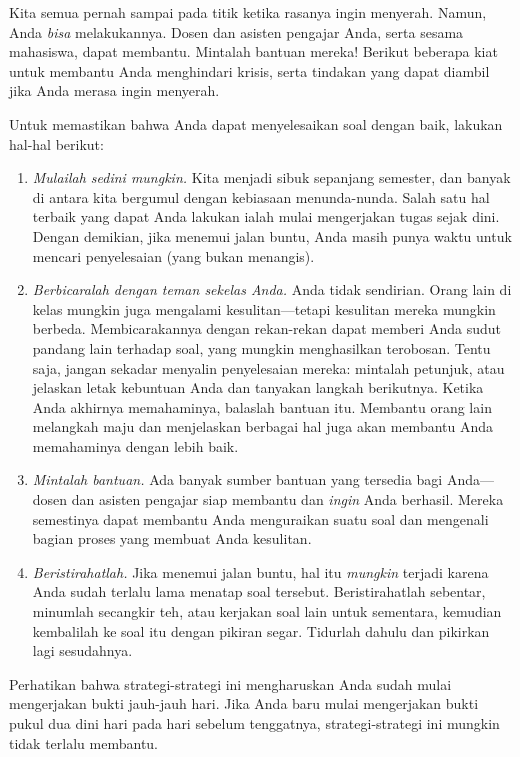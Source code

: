 \documentclass[../../../include/open-logic-section]{subfiles}
\begin{document}


Kita semua pernah sampai pada titik ketika rasanya ingin menyerah. Namun,
Anda \emph{bisa} melakukannya. Dosen dan asisten pengajar Anda, serta
sesama mahasiswa, dapat membantu. Mintalah bantuan mereka!{} Berikut
beberapa kiat untuk membantu Anda menghindari krisis, serta tindakan yang
dapat diambil jika Anda merasa ingin menyerah.

Untuk memastikan bahwa Anda dapat menyelesaikan soal dengan baik, lakukan
hal-hal berikut:
\begin{enumerate}
\item \emph{Mulailah sedini mungkin.} Kita menjadi sibuk sepanjang semester,
  dan banyak di antara kita bergumul dengan kebiasaan menunda-nunda. Salah
  satu hal terbaik yang dapat Anda lakukan ialah mulai mengerjakan tugas
  sejak dini. Dengan demikian, jika menemui jalan buntu, Anda masih punya
  waktu untuk mencari penyelesaian (yang bukan menangis).
\item \emph{Berbicaralah dengan teman sekelas Anda.} Anda tidak sendirian.
  Orang lain di kelas mungkin juga mengalami kesulitan---tetapi kesulitan
  mereka mungkin berbeda. Membicarakannya dengan rekan-rekan dapat memberi
  Anda sudut pandang lain terhadap soal, yang mungkin menghasilkan terobosan.
  Tentu saja, jangan sekadar menyalin penyelesaian mereka: mintalah petunjuk,
  atau jelaskan letak kebuntuan Anda dan tanyakan langkah berikutnya. Ketika
  Anda akhirnya memahaminya, balaslah bantuan itu. Membantu orang lain
  melangkah maju dan menjelaskan berbagai hal juga akan membantu Anda
  memahaminya dengan lebih baik.
\item \emph{Mintalah bantuan.} Ada banyak sumber bantuan yang tersedia bagi
  Anda---dosen dan asisten pengajar siap membantu dan \emph{ingin} Anda
  berhasil. Mereka semestinya dapat membantu Anda menguraikan suatu soal dan
  mengenali bagian proses yang membuat Anda kesulitan.
\item \emph{Beristirahatlah.} Jika menemui jalan buntu, hal itu \emph{mungkin}
  terjadi karena Anda sudah terlalu lama menatap soal tersebut. Beristirahatlah
  sebentar, minumlah secangkir teh, atau kerjakan soal lain untuk sementara,
  kemudian kembalilah ke soal itu dengan pikiran segar. Tidurlah dahulu dan
  pikirkan lagi sesudahnya.
\end{enumerate}

Perhatikan bahwa strategi-strategi ini mengharuskan Anda sudah mulai
mengerjakan bukti jauh-jauh hari. Jika Anda baru mulai mengerjakan bukti
pukul dua dini hari pada hari sebelum tenggatnya, strategi-strategi ini
mungkin tidak terlalu membantu.
\end{document}
